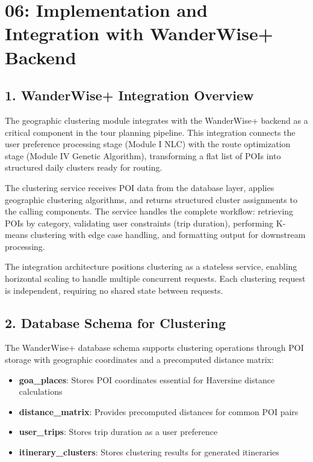 \chapter{06: Implementation and Integration with WanderWise+ Backend}

\section{1. WanderWise+ Integration Overview}

The geographic clustering module integrates with the WanderWise+ backend as a critical component in the tour planning pipeline. This integration connects the user preference processing stage (Module I NLC) with the route optimization stage (Module IV Genetic Algorithm), transforming a flat list of POIs into structured daily clusters ready for routing.

The clustering service receives POI data from the database layer, applies geographic clustering algorithms, and returns structured cluster assignments to the calling components. The service handles the complete workflow: retrieving POIs by category, validating user constraints (trip duration), performing K-means clustering with edge case handling, and formatting output for downstream processing.

The integration architecture positions clustering as a stateless service, enabling horizontal scaling to handle multiple concurrent requests. Each clustering request is independent, requiring no shared state between requests.

\section{2. Database Schema for Clustering}

The WanderWise+ database schema supports clustering operations through POI storage with geographic coordinates and a precomputed distance matrix:

\begin{itemize}
\item \textbf{goa\_places}: Stores POI coordinates essential for Haversine distance calculations
\item \textbf{distance\_matrix}: Provides precomputed distances for common POI pairs
\item \textbf{user\_trips}: Stores trip duration as a user preference
\item \textbf{itinerary\_clusters}: Stores clustering results for generated itineraries
\end{itemize}

